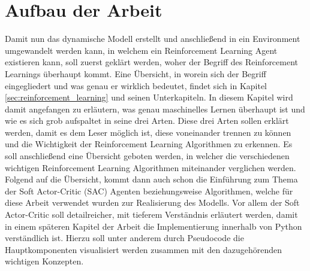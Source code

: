 \documentclass[]{iat}
\begin{document}
\section{Aufbau der Arbeit} \label{sec:aufbau_arbeit}
Damit nun das dynamische Modell erstellt und anschließend in ein Environment umgewandelt werden kann, in welchem ein Reinforcement Learning Agent existieren kann, soll zuerst geklärt werden, woher der Begriff des Reinforcement Learnings überhaupt kommt. Eine Übersicht, in worein sich der Begriff eingegliedert und was genau er wirklich bedeutet, findet sich in Kapitel \ref{sec:reinforcement_learning} und seinen Unterkapiteln. In diesem Kapitel wird damit angefangen zu erläutern, was genau maschinelles Lernen überhaupt ist und wie es sich grob aufspaltet in seine drei Arten. Diese drei Arten sollen erklärt werden, damit es dem Leser möglich ist, diese voneinander trennen zu können und die Wichtigkeit der Reinforcement Learning Algorithmen zu erkennen. Es soll anschließend eine Übersicht geboten werden, in welcher die verschiedenen wichtigen Reinforcement Learning Algorithmen miteinander verglichen werden. Folgend auf die Übersicht, kommt dann auch schon die Einführung zum Thema der Soft Actor-Critic (SAC) Agenten beziehungsweise Algorithmen, welche für diese Arbeit verwendet wurden zur Realisierung des Modells. Vor allem der Soft Actor-Critic soll detailreicher, mit tieferem Verständnis erläutert werden, damit in einem späteren Kapitel der Arbeit die Implementierung innerhalb von Python verständlich ist. Hierzu soll unter anderem durch Pseudocode die Hauptkomponenten visualisiert werden zusammen mit den dazugehörenden wichtigen Konzepten.\\
\end{document}
